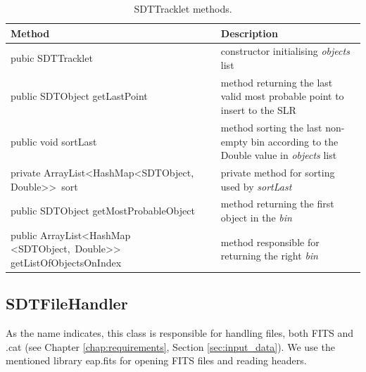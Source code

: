 \begin{table}[H]
\centering
\setlength{\extrarowheight}{2pt}
\begin{tabularx}{\textwidth}{|X|X|}
\hline
\textbf{Method} & \textbf{Description} \\ \hline
pubic \mbox{SDTTracklet} & constructor initialising \emph{objects} list \\ \hline
public SDTObject \mbox{getLastPoint} & method returning the last valid most probable point to insert to the SLR \\ \hline
public void \mbox{sortLast} & method sorting the last non-empty bin according to the Double value in \emph{objects} list \\ \hline
private \mbox{ArrayList<HashMap<SDTObject,} \mbox{Double>{}> sort} & private method for sorting used by \emph{sortLast} \\ \hline
public SDTObject \mbox{getMostProbableObject} & method returning the first object in the \emph{bin} \\ \hline
public \mbox{ArrayList<HashMap} \mbox{<SDTObject, Double>{}>{}} \mbox{getListOfObjectsOnIndex} & method responsible for returning the right \emph{bin} \\ \hline
\end{tabularx}
\caption{SDTTracklet methods.}
\label{tab:class_methods_T}
\end{table}

\newpage

\subsection{SDTFileHandler}\label{sec:file_handler}

	As the name indicates, this class is responsible for handling files, both FITS and .cat (see Chapter \ref{chap:requirements}, Section \ref{sec:input_data}). We use the mentioned library eap.fits for opening FITS files and reading headers.
	
